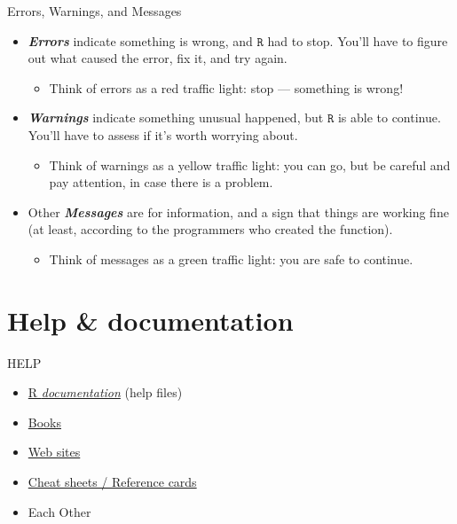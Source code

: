 \documentclass[
  11pt,
  ignorenonframetext,
]{beamer}
\providecommand{\tightlist}{%
  \setlength{\itemsep}{0pt}\setlength{\parskip}{0pt}}
\newcommand{\R}{\texttt{R}}
\begin{document}
\begin{frame}{Errors, Warnings, and Messages}
\protect\hypertarget{errors-warnings-and-messages-1}{}
\begin{itemize}
\item
  \textbf{\emph{Errors}} indicate something is wrong, and \(\R\) had to
  stop. You'll have to figure out what caused the error, fix it, and try
  again.

  \begin{itemize}
  \tightlist
  \item
    \textcolor[rgb]{0.8,0,0}{Think of errors as a red traffic light: stop --- something is wrong!
    }
  \end{itemize}
\item
  \textbf{\emph{Warnings}} indicate something unusual happened, but
  \(\R\) is able to continue. You'll have to assess if it's worth
  worrying about.

  \begin{itemize}
  \tightlist
  \item
    \textcolor[rgb]{0.9,0.7,0}{Think of warnings as a yellow traffic light: you can go, but be careful and pay attention, in case there is a problem.
    }
  \end{itemize}
\item
  Other \textbf{\emph{Messages}} are for information, and a sign that
  things are working fine (at least, according to the programmers who
  created the function).

  \begin{itemize}
  \tightlist
  \item
    \textcolor[rgb]{0,0.6,0}{Think of messages as a green traffic light: you are safe to continue.}
  \end{itemize}
\end{itemize}

\end{frame}

\hypertarget{help-documentation}{%
\section{Help \& documentation}\label{help-documentation}}

\begin{frame}{HELP}
\protect\hypertarget{help}{}
\begin{itemize}
\item
  \protect\hyperlink{textttr-documentation}{R \emph{documentation}}
  (help files)
\item
  \protect\hyperlink{help-books}{Books}
\item
  \protect\hyperlink{help-web-sites}{Web sites}
\item
  \protect\hyperlink{help-reference-cards-cheat-sheets}{Cheat sheets /
  Reference cards}
\item
  Each Other
\end{itemize}
\end{frame}
\end{document}

